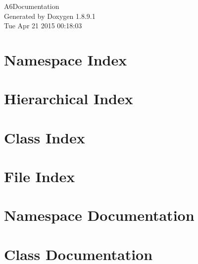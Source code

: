 \documentclass[twoside]{book}
\newcommand{\+}{\discretionary{\mbox{\scriptsize$\hookleftarrow$}}{}{}}
\newcommand{\clearemptydoublepage}{%
  \newpage{\pagestyle{empty}\cleardoublepage}%
}
\begin{document}
\hypersetup{pageanchor=false,
             bookmarks=true,
             bookmarksnumbered=true,
             pdfencoding=unicode
            }
\begin{titlepage}
\vspace*{7cm}
\begin{center}%
{\Large A6\+Documentation }\\
\vspace*{1cm}
{\large Generated by Doxygen 1.8.9.1}\\
\vspace*{0.5cm}
{\small Tue Apr 21 2015 00:18:03}\\
\end{center}
\end{titlepage}
\clearemptydoublepage
\tableofcontents
\clearemptydoublepage
{}
\hypersetup{pageanchor=true}

\chapter{Namespace Index}

\chapter{Hierarchical Index}

\chapter{Class Index}

\chapter{File Index}

\chapter{Namespace Documentation}






\chapter{Class Documentation}






















\end{document}
